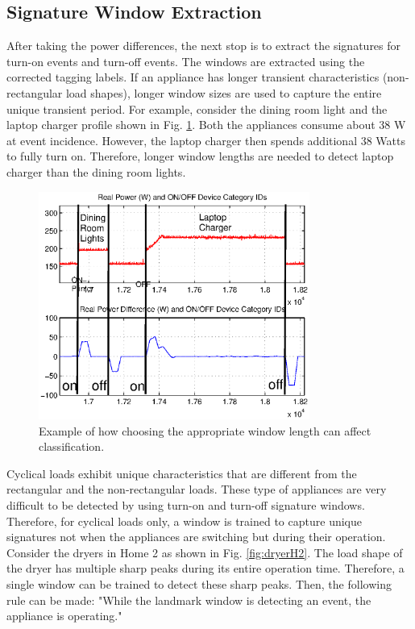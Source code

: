 \documentclass[conference]{IEEEtran}
\begin{document}
\subsection{Signature Window Extraction}
After taking the power differences, the next stop is to extract the signatures for turn-on events and turn-off events. The windows are extracted using the corrected tagging labels.  If an appliance has longer transient characteristics (non-rectangular load shapes), longer window sizes are used to capture the entire unique transient period.  For example, consider the dining room light and the laptop charger profile shown in Fig. \ref{fig:windowlength}.  Both the appliances consume about 38 W at event incidence.  However, the laptop charger then spends additional 38 Watts to fully turn on.  Therefore, longer window lengths are needed to detect laptop charger than the dining room lights. 

\begin{figure}[!t]
	\centering
	\includegraphics[width=3.5in]{fig/windowlength.eps}
	\caption{Example of how choosing the appropriate window length can affect classification.}
	\label{fig:windowlength}
\end{figure}

Cyclical loads exhibit unique characteristics that are different from the rectangular and the non-rectangular loads.  These type of appliances are very difficult to be detected by using turn-on and turn-off signature windows.  Therefore, for cyclical loads only, a window is trained to capture unique signatures not when the appliances are switching but during their operation.  Consider the dryers in Home 2 as shown in Fig. \ref{fig:dryerH2}.  The load shape of the dryer has multiple sharp peaks during its entire operation time.  Therefore, a single window can be trained to detect these sharp peaks.  Then, the following rule can be made:  "While the landmark window is detecting an event, the appliance is operating."  
\end{document}
